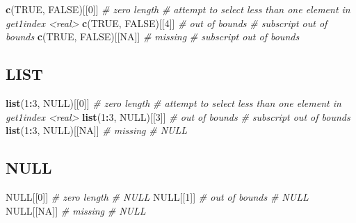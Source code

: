 \documentclass[]{book}
\newenvironment{Shaded}{\begin{snugshade}}{\end{snugshade}}
\newcommand{\CommentTok}[1]{\textcolor[rgb]{0.56,0.35,0.01}{\textit{#1}}}
\newcommand{\DecValTok}[1]{\textcolor[rgb]{0.00,0.00,0.81}{#1}}
\newcommand{\KeywordTok}[1]{\textcolor[rgb]{0.13,0.29,0.53}{\textbf{#1}}}
\newcommand{\NormalTok}[1]{#1}
\newcommand{\OperatorTok}[1]{\textcolor[rgb]{0.81,0.36,0.00}{\textbf{#1}}}
\newcommand{\OtherTok}[1]{\textcolor[rgb]{0.56,0.35,0.01}{#1}}
\begin{document}
\begin{Shaded}
\begin{Highlighting}[]
\KeywordTok{c}\NormalTok{(}\OtherTok{TRUE}\NormalTok{, }\OtherTok{FALSE}\NormalTok{)[[}\DecValTok{0}\NormalTok{]] }\CommentTok{# zero length}
\CommentTok{# attempt to select less than one element in get1index <real>}
\KeywordTok{c}\NormalTok{(}\OtherTok{TRUE}\NormalTok{, }\OtherTok{FALSE}\NormalTok{)[[}\DecValTok{4}\NormalTok{]] }\CommentTok{# out of bounds}
\CommentTok{# subscript out of bounds}
\KeywordTok{c}\NormalTok{(}\OtherTok{TRUE}\NormalTok{, }\OtherTok{FALSE}\NormalTok{)[[}\OtherTok{NA}\NormalTok{]] }\CommentTok{# missing}
\CommentTok{# subscript out of bounds}
\end{Highlighting}
\end{Shaded}

\hypertarget{lists_missing}{%
\subsection*{LIST}\label{lists_missing}}

\begin{Shaded}
\begin{Highlighting}[]
\KeywordTok{list}\NormalTok{(}\DecValTok{1}\OperatorTok{:}\DecValTok{3}\NormalTok{, }\OtherTok{NULL}\NormalTok{)[[}\DecValTok{0}\NormalTok{]] }\CommentTok{# zero length}
\CommentTok{# attempt to select less than one element in get1index <real>}
\KeywordTok{list}\NormalTok{(}\DecValTok{1}\OperatorTok{:}\DecValTok{3}\NormalTok{, }\OtherTok{NULL}\NormalTok{)[[}\DecValTok{3}\NormalTok{]] }\CommentTok{# out of bounds}
\CommentTok{# subscript out of bounds}
\KeywordTok{list}\NormalTok{(}\DecValTok{1}\OperatorTok{:}\DecValTok{3}\NormalTok{, }\OtherTok{NULL}\NormalTok{)[[}\OtherTok{NA}\NormalTok{]] }\CommentTok{# missing}
\CommentTok{# NULL}
\end{Highlighting}
\end{Shaded}

\hypertarget{null}{%
\subsection*{NULL}\label{null}}

\begin{Shaded}
\begin{Highlighting}[]
\OtherTok{NULL}\NormalTok{[[}\DecValTok{0}\NormalTok{]] }\CommentTok{# zero length}
\CommentTok{# NULL}
\OtherTok{NULL}\NormalTok{[[}\DecValTok{1}\NormalTok{]] }\CommentTok{# out of bounds}
\CommentTok{# NULL}
\OtherTok{NULL}\NormalTok{[[}\OtherTok{NA}\NormalTok{]] }\CommentTok{# missing}
\CommentTok{# NULL}
\end{Highlighting}
\end{Shaded}
\end{document}
